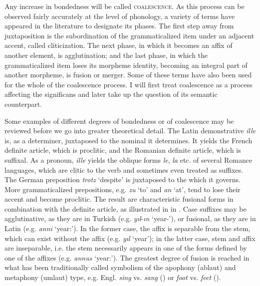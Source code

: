 Any increase in bondedness will be called \textsc{coalescence}. As this process can be observed fairly accurately at the level of phonology, a variety of terms have appeared in the literature to designate its phases. The first step away from juxtaposition is the subordination of the grammaticalized item under an adjacent accent, called cliticization. The next phase, in which it becomes an affix of another element, is agglutination; and the last phase, in which the grammaticalized item loses its morpheme identity, becoming an integral part of another morpheme, is fusion or merger. Some of these terms have also been used for the whole of the coalescence process. I will first treat coalescence as a process affecting the significans and later take up the question of its semantic counterpart.

Some examples of different degrees of bondedness or of coalescence may be reviewed before we go into greater theoretical detail. The Latin demonstrative \textit{ille} is, as a determiner, juxtaposed to the nominal it determines. It yields the French definite article, which is proclitic, and the Romanian definite article, which is suffixal. As a pronoun, \textit{ille} yields the oblique forms \textit{le}, \textit{la} etc. of several Romance languages, which are clitic to the verb and sometimes even treated as suffixes. The German preposition \textit{trotz} ‘despite’ is juxtaposed to the \np which it governs. More grammaticalized prepositions, e.g. \textit{zu} ‘to’ and \textit{an} ‘at’, tend to lose their accent and become proclitic. The result are characteristic fusional forms in combination with the definite article, as illustrated in  in . Case suffixes may be agglutinative, as they are in Turkish (e.g. \textit{yıl}{}-\textit{ın} ‘year-\gen'), or fusional, as they are in Latin (e.g. \textit{anni} ‘year:\gen’). In the former case, the affix is separable from the stem, which can exist without the affix (e.g. \textit{yıl} ‘year’); in the latter case, stem and affix are inseparable, i.e. the stem necessarily appears in one of the forms defined by one of the affixes (e.g. \textit{annus} ‘year:\glnom’). The greatest degree of fusion is reached in what has been traditionally called symbolism of the apophony (ablaut) and metaphony (umlaut) type, e.g. Engl. \textit{sing} vs. \textit{sang} (\past) or \textit{foot} vs. \textit{feet} (\glpl).

